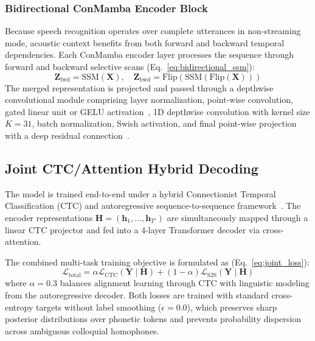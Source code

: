 \documentclass[journal]{IEEEtran}
\begin{document}
\subsubsection{Bidirectional ConMamba Encoder Block}
Because speech recognition operates over complete utterances in non-streaming mode, acoustic context benefits from both forward and backward temporal dependencies. Each ConMamba encoder layer processes the sequence through forward and backward selective scans (Eq.~\ref{eq:bidirectional_ssm}):
\begin{equation}
\mathbf{Z}_{\text{fwd}} = \text{SSM}(\mathbf{X}), \quad \mathbf{Z}_{\text{bwd}} = \text{Flip}(\text{SSM}(\text{Flip}(\mathbf{X})))
\label{eq:bidirectional_ssm}
\end{equation}
The merged representation is projected and passed through a depthwise convolutional module comprising layer normalization, point-wise convolution, gated linear unit or GELU activation~\cite{hendrycks2016gelu}, 1D depthwise convolution with kernel size $K=31$, batch normalization, Swish activation, and final point-wise projection with a deep residual connection~\cite{he2016deep,gulati2020conformer}.

\subsection{Joint CTC/Attention Hybrid Decoding}
The model is trained end-to-end under a hybrid Connectionist Temporal Classification (CTC) and autoregressive sequence-to-sequence framework~\cite{watanabe2018espnet}. The encoder representations $\mathbf{H} = (\mathbf{h}_1, \dots, \mathbf{h}_{T'})$ are simultaneously mapped through a linear CTC projector and fed into a 4-layer Transformer decoder via cross-attention.

The combined multi-task training objective is formulated as (Eq.~\ref{eq:joint_loss}):
\begin{equation}
\mathcal{L}_{\text{total}} = \alpha \mathcal{L}_{\text{CTC}}(\mathbf{Y} \mid \mathbf{H}) + (1 - \alpha) \mathcal{L}_{\text{S2S}}(\mathbf{Y} \mid \mathbf{H})
\label{eq:joint_loss}
\end{equation}
where $\alpha = 0.3$ balances alignment learning through CTC with linguistic modeling from the autoregressive decoder. Both losses are trained with standard cross-entropy targets without label smoothing ($\epsilon = 0.0$), which preserves sharp posterior distributions over phonetic tokens and prevents probability dispersion across ambiguous colloquial homophones.
\end{document}
